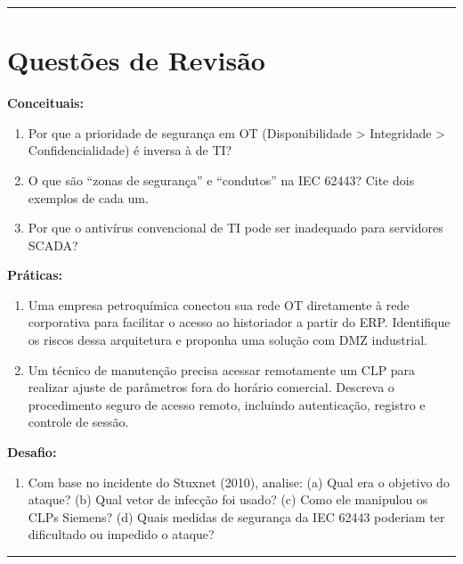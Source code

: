 \begin{center}\rule{0.5\linewidth}{0.5pt}\end{center}

\section{Questões de Revisão}\label{questuxf5es-de-revisuxe3o}

\textbf{Conceituais:}

\begin{enumerate}
\def\labelenumi{\arabic{enumi}.}
\tightlist
\item
  Por que a prioridade de segurança em OT (Disponibilidade \textgreater{} Integridade \textgreater{} Confidencialidade) é inversa à de TI?
\item
  O que são ``zonas de segurança'' e ``condutos'' na IEC 62443? Cite dois exemplos de cada um.
\item
  Por que o antivírus convencional de TI pode ser inadequado para servidores SCADA?
\end{enumerate}

\textbf{Práticas:}

\begin{enumerate}
\def\labelenumi{\arabic{enumi}.}
\setcounter{enumi}{3}
\tightlist
\item
  Uma empresa petroquímica conectou sua rede OT diretamente à rede corporativa para facilitar o acesso ao historiador a partir do ERP. Identifique os riscos dessa arquitetura e proponha uma solução com DMZ industrial.
\item
  Um técnico de manutenção precisa acessar remotamente um CLP para realizar ajuste de parâmetros fora do horário comercial. Descreva o procedimento seguro de acesso remoto, incluindo autenticação, registro e controle de sessão.
\end{enumerate}

\textbf{Desafio:}

\begin{enumerate}
\def\labelenumi{\arabic{enumi}.}
\setcounter{enumi}{5}
\tightlist
\item
  Com base no incidente do Stuxnet (2010), analise: (a) Qual era o objetivo do ataque? (b) Qual vetor de infecção foi usado? (c) Como ele manipulou os CLPs Siemens? (d) Quais medidas de segurança da IEC 62443 poderiam ter dificultado ou impedido o ataque?
\end{enumerate}

\begin{center}\rule{0.5\linewidth}{0.5pt}\end{center}

